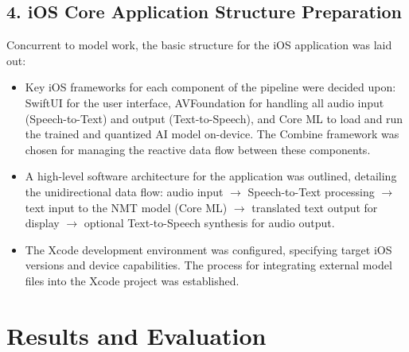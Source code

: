 \documentclass[12pt]{article}
\begin{document}
\subsection*{4. iOS Core Application Structure Preparation}
Concurrent to model work, the basic structure for the iOS application was laid out:
\begin{itemize}
    \item Key iOS frameworks for each component of the pipeline were decided upon: SwiftUI for the user interface, AVFoundation for handling all audio input (Speech-to-Text) and output (Text-to-Speech), and Core ML to load and run the trained and quantized AI model on-device. The Combine framework was chosen for managing the reactive data flow between these components.
    \item A high-level software architecture for the application was outlined, detailing the unidirectional data flow: audio input $\rightarrow$ Speech-to-Text processing $\rightarrow$ text input to the NMT model (Core ML) $\rightarrow$ translated text output for display $\rightarrow$ optional Text-to-Speech synthesis for audio output.
    \item The Xcode development environment was configured, specifying target iOS versions and device capabilities. The process for integrating external model files into the Xcode project was established.
\end{itemize}

\section{Results and Evaluation}
\end{document}
